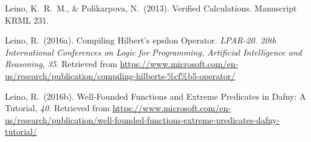 \documentclass[12pt,twoside]{article}
\begin{document}
{\begin{thebibliography}{1079}
\mdbibitemlabel{}Leino, K.~R.~M., \& Polikarpova, N.~(2013). Verified Calculations. Manuscript KRML 231.%

\mdbibitemlabel{}Leino, R.~(2016a). Compiling Hilbert’s epsilon Operator. \emph{LPAR-20. 20th International Conferences on Logic for Programming, Artificial Intelligence and Reasoning}, \emph{35}. Retrieved from \href{https://www.microsoft.com/en-us/research/publication/compiling-hilberts-\%25cf\%25b5-operator/}{{\ttfamily https://\hspace{0pt}www.\hspace{0pt}microsoft.\hspace{0pt}com/\hspace{0pt}en-\hspace{0pt}us/\hspace{0pt}research/\hspace{0pt}publication/\hspace{0pt}compiling-\hspace{0pt}hilberts-\hspace{0pt}\hspace{0pt}\%cf\hspace{0pt}\%b5-\hspace{0pt}operator/\hspace{0pt}}}%

\mdbibitemlabel{}Leino, R.~(2016b). Well-Founded Functions and Extreme Predicates in Dafny: A Tutorial, \emph{40}. Retrieved from \href{https://www.microsoft.com/en-us/research/publication/well-founded-functions-extreme-predicates-dafny-tutorial/}{{\ttfamily https://\hspace{0pt}www.\hspace{0pt}microsoft.\hspace{0pt}com/\hspace{0pt}en-\hspace{0pt}us/\hspace{0pt}research/\hspace{0pt}publication/\hspace{0pt}well-\hspace{0pt}founded-\hspace{0pt}functions-\hspace{0pt}extreme-\hspace{0pt}predicates-\hspace{0pt}dafny-\hspace{0pt}tutorial/\hspace{0pt}}}%


\end{thebibliography}}
\end{document}
